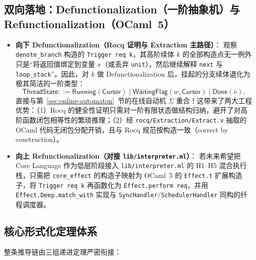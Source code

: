 \documentclass[UTF8,a4paper,11pt,fontset=fandol]{ctexart}
\newcommand{\code}[1]{\texttt{#1}}
\begin{document}
\subsection{双向落地：Defunctionalization（一阶抽象机）与 Refunctionalization（OCaml~5）}

\begin{itemize}
\item \textbf{向下 Defunctionalization（Rocq 证明与 Extraction 主路径）}：
  观察 \code{denote\_branch} 构造的 \code{Trigger req k}，其高阶续体 $k$ 的全部构造点无一例外只是“将返回值绑定到变量 $x$（或丢弃 \code{unit}），然后继续解释 \code{next} 与 \code{loop\_stack}”。因此，对 $k$ 做 Defunctionalization 后，挂起的分支续体退化为极其简洁的一阶类型：
  \[
  \mathsf{ThreadState} ::= \mathsf{Running}(\mathsf{Cursor}) \mid \mathsf{WaitingFlag}(w, \mathsf{Cursor}) \mid \mathsf{Done}(\bar\nu),
  \]
  直接与第~\ref{sec:online-automaton}~节的在线自动机 $\Sigma$ 重合！这带来了两大工程优势：（1）Rocq 的健全性证明只需对一阶有限状态做结构归纳，避开了对高阶函数闭包相等性的繁琐推理；（2）经 \code{rocq/Extraction/Extract.v} 抽取的 OCaml 代码无闭包分配开销，且与 Rocq 规范按构造一致（correct by construction）。
\item \textbf{向上 Refunctionalization（对接 \code{lib/interpreter.ml}）}：
  若未来希望把 Core Language 作为低层阶段接入 \code{lib/interpreter.ml} 的 H1--H5 混合执行栈，只需把 \code{core\_effect} 的构造子映射为 OCaml~5 的 \code{Effect.t} 扩展构造子，将 \code{Trigger req k} 再函数化为 \code{Effect.perform req}，并用 \code{Effect.Deep.match\_with} 实现与 \code{SyncHandler}/\code{SchedulerHandler} 同构的纤程调度器。
\end{itemize}

\subsection{核心形式化定理体系}

整条推导链由三组递进定理严密衔接：
\end{document}
